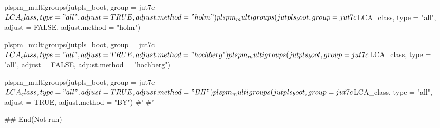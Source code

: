 \documentclass[a4paper]{book}
\begin{document}
\begin{Examples}
\begin{ExampleCode}
plspm_multigroups(jutpls_boot, group = jut7c$LCA_class,
                  type = "all", adjust = TRUE, adjust.method = "holm")

plspm_multigroups(jutpls_boot, group = jut7c$LCA_class,
                  type = "all", adjust = FALSE, adjust.method = "holm")

plspm_multigroups(jutpls_boot, group = jut7c$LCA_class,
                  type = "all", adjust = TRUE, adjust.method = "hochberg")
plspm_multigroups(jutpls_boot, group = jut7c$LCA_class,
                  type = "all", adjust = FALSE, adjust.method = "hochberg")

plspm_multigroups(jutpls_boot, group = jut7c$LCA_class,
                  type = "all", adjust = TRUE, adjust.method = "BH")

plspm_multigroups(jutpls_boot, group = jut7c$LCA_class,
                  type = "all", adjust = TRUE, adjust.method = "BY")
#'
#'

## End(Not run)
\end{ExampleCode}
\end{Examples}
\end{document}
